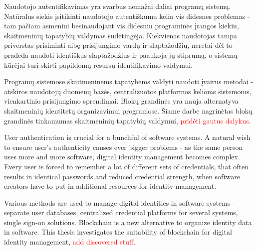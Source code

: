 Naudotojo autentifikavimas yra svarbus nemažai daliai programų sistemų. Natūralus siekis
įsitikinti naudotojo autentiškumu kelia vis didesnes problemas - tam pačiam asmeniui besinaudojant
vis didesniu programinės įrangos kiekiu, skaitmeninių tapatybių valdymas sudėtingėja.
Kiekvienas naudotojas tampa priverstas prisiminti aibę prisijungimo
vardų ir slaptažodžių, neretai dėl to pradeda naudoti identiškus slaptažodžius ir paaukoja jų stiprumą, o sistemų kūrėjai turi
skirti papildomų resursų identifikavimo valdymui.


Programų sistemose skaitmeninėms tapatybėms valdyti naudoti įvairūs metodai - atskiros naudotojų duomenų bazės,
centralizuotos platformos kelioms sistemoms, vienkartinio prisijungimo sprendimai. Blokų grandinės yra nauja
alternatyva skaitmeninių identitetų organizavimui programose. Šiame darbe nagrinėtas blokų grandinės
tinkamumas skaitmeninių tapatybių valdymui, \textcolor{red}{pridėti gautus dalykus}.



User authentication is crucial for a bunchful of software systems. A natural wish to
ensure user's authenticity causes ever bigger problems - as the same person uses more and more software,
digital identity management becomes complex. Every user is forced to remember a lot of different sets of credentials,
that often results in identical passwords and reduced credential strength, when software creators have to put
in additional resources for identity management.

Various methods are used to manage digital identities in software systems - separate user databases,
centralized credential platforms for several systems, single sign-on solutions. Blockchain is a new
alternative to organize identity data in software. This thesis investigates the suitability of blockchain
for digital identity management, \textcolor{red}{add discovered stuff}.
